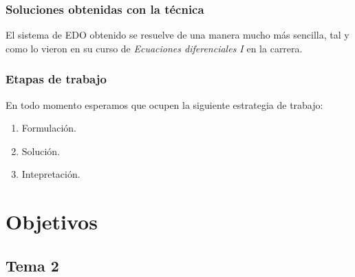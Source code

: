 \documentclass[12pt]{beamer}
\begin{document}
\begin{frame}
\frametitle{Soluciones obtenidas con la técnica}
El sistema de EDO obtenido se resuelve de una manera mucho más sencilla, tal y como lo vieron en su curso de \emph{Ecuaciones diferenciales I} en la carrera.
\end{frame}
\begin{frame}
\frametitle{Etapas de trabajo}
En todo momento esperamos que ocupen la siguiente estrategia de trabajo:
\pause
{}
\begin{enumerate}[<+->]
\item Formulación.
\item Solución.
\item Intepretación.
\end{enumerate}
\end{frame}

\section{Objetivos}
\subsection{Tema 2}
\end{document}
